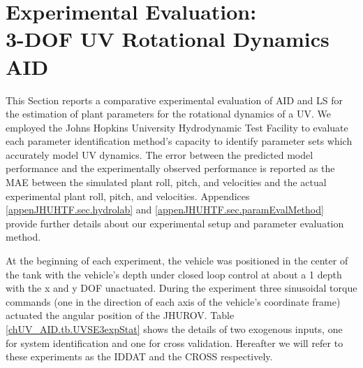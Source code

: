 \section{Experimental Evaluation: \\3-\acs{DOF}  \acs{UV} Rotational Dynamics \acs{AID}}
\label{chUV_AID.sec.UVSO3exp}

This Section reports a comparative experimental evaluation of \ac{AID}
and \ac{LS} for the estimation of plant parameters for the rotational
dynamics of a \ac{UV}.
%
We employed the Johns Hopkins University Hydrodynamic Test Facility to
evaluate each parameter identification method's capacity to identify
parameter sets which accurately model \ac{UV} dynamics.
%
The error between the predicted model performance and the
experimentally observed performance is reported as the \ac{MAE}
between the simulated plant roll, pitch, and velocities and the actual
experimental plant roll, pitch, and velocities.
%
Appendices \ref{appenJHUHTF.sec.hydrolab}
and \ref{appenJHUHTF.sec.paramEvalMethod} provide further details about
our experimental setup and parameter evaluation method.


At the beginning of each experiment, the vehicle was positioned in the
center of the tank with the vehicle's depth under closed loop control
at about a \unit{1}{\m} depth with the x and y \ac{DOF} unactuated.
%
During the experiment three sinusoidal torque commands (one in the
direction of each axis of the vehicle's coordinate frame) actuated the
angular position of the \ac{JHUROV}.
%
Table \ref{chUV_AID.tb.UVSE3expStat} shows the details of two exogenous
inputs, one for system identification and one for cross validation.
%
Hereafter we will refer to these experiments as the \ac{IDDAT} and the
\ac{CROSS} respectively.



